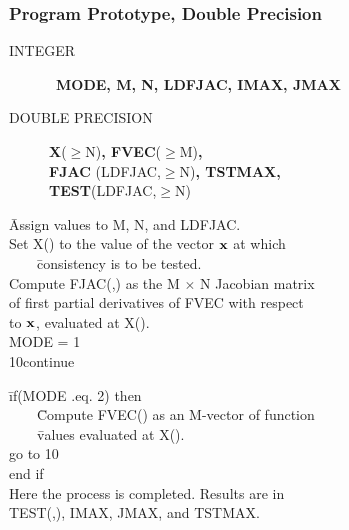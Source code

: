 \documentclass[twoside]{MATH77}
\begin{document}
\subsubsection{Program Prototype, Double Precision}
\begin{description}
\item[INTEGER]  \ {\bf MODE, M, N, LDFJAC, IMAX, JMAX}

\item[DOUBLE PRECISION]  {\bf X}($\geq $N){\bf , FVEC}($\geq $M){\bf ,\\ FJAC%
}(LDFJAC,$\geq $N){\bf , TSTMAX,\\ TEST}(LDFJAC,$\geq $N)
\end{description}
\begin{tabbing}
\hspace{.2in}\=Assign values to M, N, and LDFJAC.\\

\>Set X() to the value of the vector ${\bf x}$ at which\\
\>\ \ \ \ \=consistency is to be tested.\\

\>Compute FJAC(,) as the M $\times $ N Jacobian matrix\\
\>\>of first partial derivatives of FVEC with respect\\
\>\>to ${\bf x}$, evaluated at X().\\

\>MODE = 1\\

10\>continue
\end{tabbing}\vspace{-8pt}
\begin{center}
\end{center}
\begin{tabbing}
\hspace{.2in}\=if(MODE .eq. 2) then\\

\>\ \ \ \ \=Compute FVEC() as an M-vector of function\\
\>\>\ \ \ \ \=values evaluated at X().\\

\>\>go to 10\\

\>end if\\

\>Here the process is completed. Results are in\\
\>TEST(,), IMAX, JMAX, and TSTMAX.
\end{tabbing}
\end{document}
